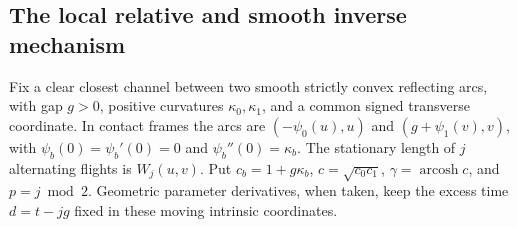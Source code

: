 \subsection{The local relative and smooth inverse mechanism}

Fix a clear closest channel between two smooth strictly convex reflecting
arcs, with gap $g>0$, positive curvatures $\kappa_0,\kappa_1$, and a
common signed transverse coordinate.  In contact frames the arcs are
$(-\psi_0(u),u)$ and $(g+\psi_1(v),v)$, with
$\psi_b(0)=\psi_b'(0)=0$ and $\psi_b''(0)=\kappa_b$.
The stationary length of $j$ alternating flights is $W_j(u,v)$.
Put $c_b=1+g\kappa_b$, $c=\sqrt{c_0c_1}$,
$\gamma=\operatorname{arcosh}c$, and $p=j\bmod2$.  Geometric
parameter derivatives, when taken, keep the excess time
$d=t-jg$ fixed in these moving intrinsic coordinates.

